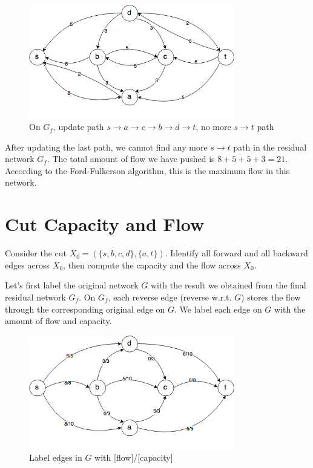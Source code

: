 \documentclass{article}
\begin{document}
\begin{figure}[H]
\centering
\includegraphics[width=0.8\textwidth]{gf_4.png}
\caption{On $G_f$, update path $s \rightarrow a \rightarrow c \rightarrow b
\rightarrow d \rightarrow t$, no more $s \rightarrow t$ path}
\end{figure}

After updating the last path, we cannot find any more $s \rightarrow t$
path in the residual network $G_f$. The total amount of flow we have pushed
is $8 + 5 + 5 + 3 = 21$. According to the Ford-Fulkerson algorithm, this
is the maximum flow in this network.

\section{Cut Capacity and Flow}
Consider the cut $X_0 = (\{s,b,c,d\}, \{a,t\})$. Identify all forward and
all backward edges across $X_0$, then compute the capacity and the flow
across $X_0$.

Let's first label the original network $G$ with the result we obtained from
the final residual network $G_f$. 
On $G_f$, each reverse edge (reverse w.r.t. $G$) 
stores the flow through the corresponding original edge on $G$.
We label each edge on $G$ with the amount of flow and capacity.

\begin{figure}[H]
\centering
\includegraphics[width=0.8\textwidth]{g_1.png}
\caption{Label edges in $G$ with [flow]/[capacity]}
\end{figure}
\end{document}

